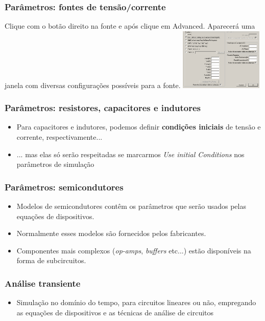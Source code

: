 \documentclass{beamer}
\begin{document}
\begin{frame}
\frametitle{Parâmetros: fontes de tensão/corrente}
Clique com o botão direito na fonte e após clique em Advanced. Aparecerá uma janela com diversas configurações possíveis para a fonte.
\includegraphics[width=150px]{images/paramfonte.png}
\end{frame}

\begin{frame}
\end{frame}

\begin{frame}
\frametitle{Parâmetros: resistores, capacitores e indutores}
\begin{itemize}
\item{Para capacitores e indutores, podemos definir \textbf{condições iniciais} de tensão e corrente, respectivamente...}
\item{... mas elas só serão respeitadas se marcarmos \textit{Use initial Conditions} nos parâmetros de simulação}
\end{itemize}
\end{frame}

\begin{frame}
\frametitle{Parâmetros: semicondutores}
\begin{itemize}
\item{Modelos de semicondutores contêm os parâmetros que serão usados pelas equações de dispositivos.}
\item{Normalmente esses modelos são fornecidos pelos fabricantes.}
\item{Componentes mais complexos (\textit{op-amps}, \textit{buffers} etc...) estão disponíveis na forma de subcircuitos.}
\end{itemize}
\end{frame}


\begin{frame}
\frametitle{Análise transiente}
\begin{itemize}
\item{Simulação no domínio do tempo, para circuitos lineares ou não, empregando as equações de dispositivos e as técnicas de análise de circuitos}
\end{itemize}
\end{frame}
\end{document}
